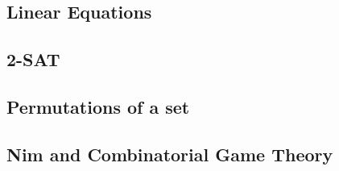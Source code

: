 \documentclass[10pt]{article}
\begin{document}
		\newpage
		\subsection{Linear Equations}
		
				
		\subsection{2-SAT}
		
				
		\subsection{Permutations of a set}
		
		
		\subsection{Nim and Combinatorial Game Theory}
		
		
	
\end{document}

